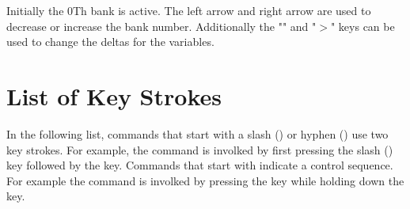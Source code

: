 Initially the 0Th bank is
active. The left arrow and right arrow are used to decrease or
increase the bank number.  Additionally the "\vn{<}" and "$>$" keys
can be used to change the deltas for the variables.

\section{List of Key Strokes}
\label{s:keys}

In the following list, commands that start with a slash (\vn{/}) or
hyphen (\vn{-}) use two key strokes. For example, the  command
is involked by first pressing the slash (\vn{/}) key followed by the
 key. Commands that start with \vn{\W} indicate a control
sequence. For example the  command is involked by pressing
the  key while holding down the  key.

